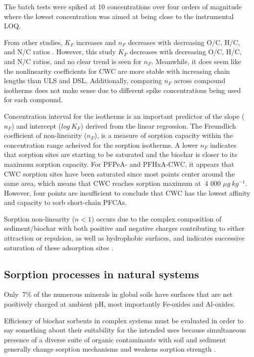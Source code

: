 The batch tests were spiked at 10 concentrations over four orders of magnitude where the lowest concentration was aimed at being close to the instrumental LOQ. 

From other studies, $K_F$ increases and $n_F$ decreases with decreasing O/C, H/C, and N/C ratios \citep{Cornelissen2005}. However, this study $K_F$ decreases with decreasing O/C, H/C, and N/C ratios, and no clear trend is seen for $n_F$. Meanwhile, it does seem like the nonlinearity coefficients for CWC are more stable with increasing chain lengths than ULS and DSL. Additionally, comparing $n_F$ across compound isotherms does not make sense due to different spike concentrations being used for each compound.

Concentration interval for the isotherms is an important predictor of the slope ($n_F$) and intercept ($log~K_F$) derived from the linear regression.  The Freundlich coefficient of non-linearity ($n_F$), is a measure of sorption capacity within the concentration range acheived for the sorption isotherms. A lower $n_F$ indicates that sorption sites are starting to be saturated and the biochar is closer to its maximum sorption capacity.  For PFPeA- and PFHxA-CWC, it appears that CWC sorption sites have been saturated since most points center around the same area, which means that CWC reaches sorption maximum at $~$4 000 $\mu g~kg^{-1}$. However, four points are insufficient to conclude that CWC has the lowest affinity and capacity to sorb short-chain PFCAs. 

Sorption non-linearity ($n<1$) occurs due to the complex composition of sediment/biochar with both positive and negative charges contributing to either attraction or repulsion, as well as hydrophobic surfaces, and indicates successive saturation of these adsorption sites \citep{yin2022insights}. 

\subsection{Sorption processes in natural systems}\label{sec:natural}
Only $~7\%$ of the numerous minerals in global soils have surfaces that are net positively charged at ambient pH, most importantly Fe-oxides and Al-oxides. 

Efficiency of biochar sorbents in complex systems must be evaluated in order to say something about their suitability for the intended uses because simultaneous presence of a diverse suite of organic contaminants with soil and sediment generally change sorption mechanisms and weakens sorption strength \citep{zhou2010sorption}.

